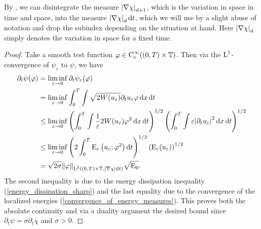\begin{remark}
	By 
	\cite[Thm.~3.103]{ambrosio_fusco_pallara_functions_of_bv_and_free_discontinuity_problems},
	we can disintegrate the measure $ \abs{ \nabla \chi }_{ d + 1 } $, which 
	is the variation in space in time and space, into the measure $ \abs{ 
		\nabla \chi }_{ d } \dd{ t } $, which we will use by a slight abuse of 
	notation and drop the subindex depending on the situation at hand. Here $ 
	\abs{ \nabla \chi }_{ d } $ simply denotes the variation in space for a 
	fixed time.
\end{remark}

\begin{proof}
	Take a smooth test function $ \varphi \in \operatorname{C}_{ \mathrm{ c } }^{ \infty } 
	( ( 0 , T ) \times \operatorname{\mathbb{T}} )$. 
	Then via the $ \operatorname{L}^{ 1 } $-convergence of $ \psi_{ \varepsilon } $ to $ 
	\psi 
	$, we have
	\begin{align*}
		\partial_{ t } \psi ( \varphi )
		& =
		\liminf_{ \varepsilon \to 0 }
		\partial_{ t } \psi_{ \varepsilon } ( \varphi )
		\\
		& =
		\liminf_{ \varepsilon \to 0 }
		\int_{ 0 }^{ T }
		\int
		\sqrt{ 2 W ( u_{ \varepsilon } ) }
		\partial_{ t } u_{ \varepsilon }
		\varphi
		\dd{ x }
		\dd{ t }
		\\
		& \leq
		\liminf_{ \varepsilon \to 0 }
		\left( 
		\int_{ 0 }^{ T }
		\int
		\frac{ 1 }{ \varepsilon } 2 W ( u_{ \varepsilon } )
		\varphi^{ 2 }
		\dd{ x }
		\dd{ t }
		\right)^{ 1/ 2 }
		\left(
		\int_{ 0 }^{ T }
		\int
		\varepsilon
		\abs{ \partial_{ t } u_{ \varepsilon } }^{ 2 }
		\dd{ x }
		\dd{ t }
		\right)^{ 1/2 }
		\\
		& \leq
		\liminf_{ \varepsilon \to 0 }
		\left(
		2 
		\int_{ 0 }^{ T }
		\operatorname{E}_{ \varepsilon} \left( u_{ \varepsilon } ; \varphi^{ 2 } \right)
		\dd{ t }
		\right)^{ 1/ 2 }
		\left(
		\operatorname{E}_{ \varepsilon } ( u_{ \varepsilon } )
		\right)^{ 1/2 }
		\\
		& =
		\sqrt{ 2 \sigma }
		\norm{ \varphi }_{ \operatorname{L}^{ 2 } ( ( 0 , T ) \times \operatorname{\mathbb{T}} , \abs{ 
				\nabla \chi } \dd{ t 
			} ) }
		\sqrt{ \operatorname{E}_{ 0 } }.
	\end{align*}
	The second inequality is due to the energy dissipation inequality 
	(\ref{energy_dissipation_sharp}) and the last equality due to the 
	convergence of the localized energies 
	(\ref{convergence_of_energy_measures}).
	This proves both the absolute continuity and via a duality argument the 
	desired bound since $ \partial_{ t } \psi = \sigma \partial_{ t } \chi $ 
	and $ \sigma > 0 $.
\end{proof}

